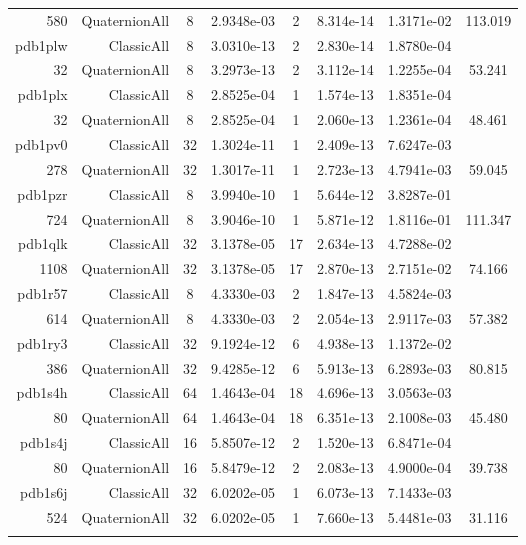 \begin{xltabular}{\textwidth}{r|rcS[table-format=1.4e+2]cS[table-format=1.3e+2]S[table-format=1.4e+2]S[table-format=-1.3]}
580 & QuaternionAll & 8 & 2.9348e-03 & 2 & 8.314e-14 & 1.3171e-02 & 113.019\\  \addlinespace
pdb1plw & ClassicAll & 8 & 3.0310e-13 & 2 & 2.830e-14 & 1.8780e-04 & \\
32 & QuaternionAll & 8 & 3.2973e-13 & 2 & 3.112e-14 & 1.2255e-04 & 53.241\\  \addlinespace
pdb1plx & ClassicAll & 8 & 2.8525e-04 & 1 & 1.574e-13 & 1.8351e-04 & \\
32 & QuaternionAll & 8 & 2.8525e-04 & 1 & 2.060e-13 & 1.2361e-04 & 48.461\\  \addlinespace
pdb1pv0 & ClassicAll & 32 & 1.3024e-11 & 1 & 2.409e-13 & 7.6247e-03 & \\
278 & QuaternionAll & 32 & 1.3017e-11 & 1 & 2.723e-13 & 4.7941e-03 & 59.045\\  \addlinespace
pdb1pzr & ClassicAll & 8 & 3.9940e-10 & 1 & 5.644e-12 & 3.8287e-01 & \\
724 & QuaternionAll & 8 & 3.9046e-10 & 1 & 5.871e-12 & 1.8116e-01 & 111.347\\  \addlinespace
pdb1qlk & ClassicAll & 32 & 3.1378e-05 & 17 & 2.634e-13 & 4.7288e-02 & \\
1108 & QuaternionAll & 32 & 3.1378e-05 & 17 & 2.870e-13 & 2.7151e-02 & 74.166\\  \addlinespace
pdb1r57 & ClassicAll & 8 & 4.3330e-03 & 2 & 1.847e-13 & 4.5824e-03 & \\
614 & QuaternionAll & 8 & 4.3330e-03 & 2 & 2.054e-13 & 2.9117e-03 & 57.382\\  \addlinespace
pdb1ry3 & ClassicAll & 32 & 9.1924e-12 & 6 & 4.938e-13 & 1.1372e-02 & \\
386 & QuaternionAll & 32 & 9.4285e-12 & 6 & 5.913e-13 & 6.2893e-03 & 80.815\\  \addlinespace
pdb1s4h & ClassicAll & 64 & 1.4643e-04 & 18 & 4.696e-13 & 3.0563e-03 & \\
80 & QuaternionAll & 64 & 1.4643e-04 & 18 & 6.351e-13 & 2.1008e-03 & 45.480\\  \addlinespace
pdb1s4j & ClassicAll & 16 & 5.8507e-12 & 2 & 1.520e-13 & 6.8471e-04 & \\
80 & QuaternionAll & 16 & 5.8479e-12 & 2 & 2.083e-13 & 4.9000e-04 & 39.738\\  \addlinespace
pdb1s6j & ClassicAll & 32 & 6.0202e-05 & 1 & 6.073e-13 & 7.1433e-03 & \\
524 & QuaternionAll & 32 & 6.0202e-05 & 1 & 7.660e-13 & 5.4481e-03 & 31.116\\  \addlinespace

\end{xltabular}

